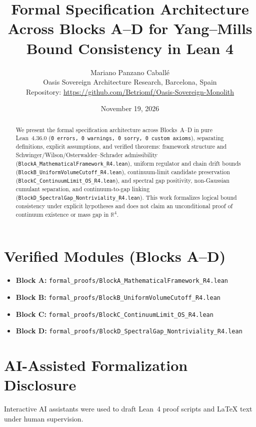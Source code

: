 \documentclass[11pt,a4paper]{article}
\title{\textbf{Formal Specification Architecture Across Blocks A--D for Yang--Mills Bound Consistency in Lean 4}}
\author{Mariano Panzano Caball\'e \\ \small Oasis Sovereign Architecture Research, Barcelona, Spain \\ \small Repository: \url{https://github.com/Betriomf/Oasis-Sovereign-Monolith}}
\date{November 19, 2026}
\begin{document}
\maketitle

\begin{abstract}
We present the formal specification architecture across Blocks~A--D in pure Lean~4.36.0 (\texttt{0 errors, 0 warnings, 0 sorry, 0 custom axioms}), separating definitions, explicit assumptions, and verified theorems: framework structure and Schwinger/Wilson/Osterwalder--Schrader admissibility (\texttt{BlockA\_MathematicalFramework\_R4.lean}), uniform regulator and chain drift bounds (\texttt{BlockB\_UniformVolumeCutoff\_R4.lean}), continuum-limit candidate preservation (\texttt{BlockC\_ContinuumLimit\_OS\_R4.lean}), and spectral gap positivity, non-Gaussian cumulant separation, and continuum-to-gap linking (\texttt{BlockD\_SpectralGap\_Nontriviality\_R4.lean}). This work formalizes logical bound consistency under explicit hypotheses and does not claim an unconditional proof of continuum existence or mass gap in $\mathbb{R}^4$.
\end{abstract}

\section{Verified Modules (Blocks A--D)}
\begin{itemize}
  \item \textbf{Block A:} \texttt{formal\_proofs/BlockA\_MathematicalFramework\_R4.lean}
  \item \textbf{Block B:} \texttt{formal\_proofs/BlockB\_UniformVolumeCutoff\_R4.lean}
  \item \textbf{Block C:} \texttt{formal\_proofs/BlockC\_ContinuumLimit\_OS\_R4.lean}
  \item \textbf{Block D:} \texttt{formal\_proofs/BlockD\_SpectralGap\_Nontriviality\_R4.lean}
\end{itemize}

\section{AI-Assisted Formalization Disclosure}
Interactive AI assistants were used to draft Lean~4 proof scripts and LaTeX text under human supervision.
\end{document}

